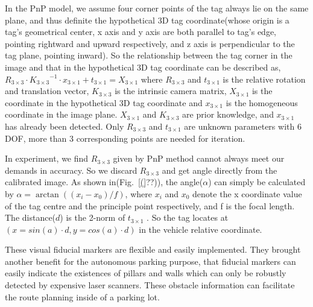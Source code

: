 \documentclass[journal]{IEEEtran}
\newcommand{\Reffig}[1]{Fig.~\ref{#1}}
\begin{document}
In the PnP model, we assume four corner points of the tag always lie on the same plane, and thus definite the hypothetical 3D tag coordinate(whose origin is a tag’s geometrical center, x axis and y axis are both parallel to tag’s edge, pointing rightward and upward respectively, and z axis is perpendicular to the tag plane, pointing inward). 
So the relationship between the tag corner in the image and that in the hypothetical 3D tag coordinate can be described as,
${R}_{3 \times 3} \cdot {{K}_{3 \times 3}}^{-1} \cdot {x}_{3 \times 1}+{t}_{3 \times 1}={X}_{3 \times 1}$
where ${R}_{3 \times 3}$ and ${t}_{3 \times 1}$ is the relative rotation and translation vector, 
${K}_{3 \times 3}$ is the intrinsic camera matrix, 
${X}_{3 \times 1}$ is the coordinate in the hypothetical 3D tag coordinate and ${x}_{3 \times 1}$ is the homogeneous coordinate in the image plane. 
${X}_{3 \times 1}$ and ${K}_{3 \times 3}$ are prior knowledge, 
and ${x}_{3 \times 1}$ has already been detected. 
Only ${R}_{3 \times 3}$ and ${t}_{3 \times 1}$ are unknown parameters with 6 DOF, more than 3 corresponding points are needed for iteration. 

In experiment, we find ${R}_{3 \times 3}$ given by PnP method cannot always meet our demands in accuracy.
So we discard ${R}_{3 \times 3}$ and get angle directly from the calibrated image.
As shown in(\Reffig(??)), the angle($\alpha$) can simply be calculated by $\alpha = \arctan((x_i - x_0) / f)$, where $x_i$ and $x_0$ denote the x coordinate value of the tag centre and the principle point respectively, and f is the focal length.
The distance($d$) is the 2-norm of ${t}_{3 \times 1}$ . 
So the tag locates at $( x=sin(a) \cdot d, y=cos(a) \cdot d)$ in the vehicle relative coordinate.

These visual fiducial markers are flexible and easily implemented.
They brought another benefit for the autonomous parking purpose, that fiducial markers can easily indicate the existences of pillars and walls which can only be robustly detected by expensive laser scanners.
These obstacle information can facilitate the route planning inside of a parking lot. 
\end{document}
